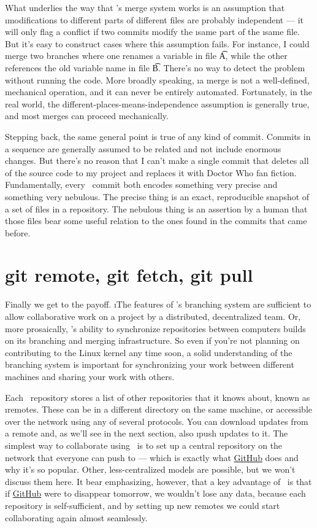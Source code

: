\documentclass[letterpaper,12pt,titlepage,twoside]{article}
\begin{document}
What underlies the way that \git's merge system works is an assumption that
\i{modifications to different parts of different files are probably
  independent} --- it will only flag a conflict if two commits modify the
\i{same} part of the \i{same} file. But it's easy to construct cases where
this assumption fails. For instance, I could merge two branches where one
renames a variable in file \t{A}, while the other references the old variable
name in file \t{B}. There's no way to detect the problem without running the
code. More broadly speaking, \i{a merge is not a well-defined, mechanical
  operation, and it can never be entirely automated}. Fortunately, in the real
world, the different-places-means-independence assumption is generally true,
and most merges can proceed mechanically.

Stepping back, the same general point is true of any kind of commit. Commits
in a sequence are generally assumed to be related and not include enormous
changes. But there's no reason that I can't make a single commit that deletes
all of the source code to my project and replaces it with Doctor Who fan
fiction. Fundamentally, every \git\ commit both encodes something very precise
and something very nebulous. The precise thing is an exact, reproducible
snapshot of a set of files in a repository. The nebulous thing is an assertion
by a human that those files bear some useful relation to the ones found in the
commits that came before.


\section{git remote, git fetch, git pull}

Finally we get to the payoff. \i{The features of \git's branching system are
  sufficient to allow collaborative work on a project by a distributed,
  decentralized team.} Or, more prosaically, \git's ability to synchronize
repositories between computers builds on its branching and merging
infrastructure. So even if you're not planning on contributing to the Linux
kernel any time soon, a solid understanding of the branching system is
important for synchronizing your work between different machines and sharing
your work with others.

Each \git\ repository stores a list of other repositories that it knows about,
known as \i{remotes}. These can be in a different directory on the same
machine, or accessible over the network using any of several protocols. You
can download updates from a remote and, as we'll see in the next section, also
\i{push} updates to it. The simplest way to collaborate using \git\ is to set
up a central repository on the network that everyone can push to --- which is
exactly what \href{https://github.com/}{GitHub} does and why it's so popular.
Other, less-centralized models are possible, but we won't discuss them here.
It bear emphasizing, however, that a key advantage of \git\ is that if
\href{https://github.com/}{GitHub} were to disappear tomorrow, we wouldn't
lose any data, because each repository is self-sufficient, and by setting up
new remotes we could start collaborating again almost seamlessly.
\end{document}
